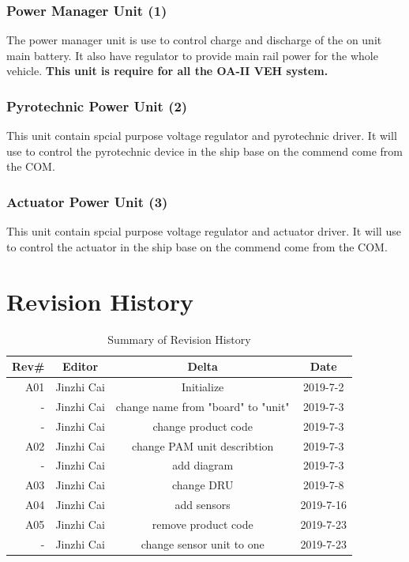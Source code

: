 \documentclass[12pt,article]{memoir}
\begin{document}
\subsection{Power Manager Unit (1)}
The power manager unit is use to control charge and discharge of the on unit main battery. It also have regulator to provide main rail power for the whole vehicle. \textbf{This unit is require for all the OA-II VEH system.}
\subsection{Pyrotechnic Power Unit (2)}
This unit contain spcial purpose voltage regulator and pyrotechnic driver. It will use to control the pyrotechnic device in the ship base on the commend come from the COM. 
\subsection{Actuator Power Unit (3)}
This unit contain spcial purpose voltage regulator and actuator driver. It will use to control the actuator in the ship base on the commend come from the COM.
\newpage
\chapter{Revision History}%
\begin{table}[H]
	\centering
	\begin{tabu}{r || c | c | c }
		Rev\# & Editor & Delta & Date\\ \hline
		A01 & Jinzhi Cai & Initialize  & 2019-7-2\\
		- & Jinzhi Cai & change name from "board" to "unit" & 2019-7-3\\
		- & Jinzhi Cai & change product code & 2019-7-3\\ \hline
		A02 & Jinzhi Cai & change PAM unit describtion & 2019-7-3\\
		- & Jinzhi Cai & add diagram & 2019-7-3\\ \hline
		A03 & Jinzhi Cai & change DRU & 2019-7-8\\ \hline
		A04 & Jinzhi Cai & add sensors & 2019-7-16\\ \hline
		A05 & Jinzhi Cai & remove product code & 2019-7-23\\ 
		- & Jinzhi Cai & change sensor unit to one & 2019-7-23\\ \hline
	\end{tabu}
	\caption{Summary of Revision History}
	\label{tab:edatools}
\end{table}
\end{document}
